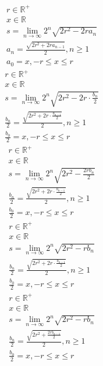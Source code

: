 \documentclass[a4paper,12pt]{report}
\begin{document}
\begin{subequations}
\begin{gather}
r \in \mathbb{R}^+ \\
x \in \mathbb{R} \\
s = \lim \limits_{n \to \infty} 2^n \sqrt{2r^2 - 2ra_n} \\
a_n = \frac{\sqrt{2r^2 + 2ra_{n-1}}}{2}, n \geq 1 \\
a_0 = x, -r \leq x \leq r
\end{gather}
\end{subequations}
\begin{subequations}
\begin{gather}
r \in \mathbb{R}^+ \\
x \in \mathbb{R} \\
s = \lim \limits_{n \to \infty} 2^n \sqrt{2r^2 - 2r \cdot \frac{b_n}{2}} \\
\frac{b_n}{2} = \frac{\sqrt{2r^2 + 2r \cdot \frac{b_{n-1}}{2}}}{2}, n \geq 1 \\
\frac{b_0}{2} = x, -r \leq x \leq r
\end{gather}
\end{subequations}
\begin{subequations}
\begin{gather}
r \in \mathbb{R}^+ \\
x \in \mathbb{R} \\
s = \lim \limits_{n \to \infty} 2^n \sqrt{2r^2 - \frac{2rb_n}{2}} \\
\frac{b_n}{2} = \frac{\sqrt{2r^2 + 2r \cdot \frac{b_{n-1}}{2}}}{2}, n \geq 1 \\
\frac{b_0}{2} = x, -r \leq x \leq r
\end{gather}
\end{subequations}
\begin{subequations}
\begin{gather}
r \in \mathbb{R}^+ \\
x \in \mathbb{R} \\
s = \lim \limits_{n \to \infty} 2^n \sqrt{2r^2 - rb_n} \\
\frac{b_n}{2} = \frac{\sqrt{2r^2 + 2r \cdot \frac{b_{n-1}}{2}}}{2}, n \geq 1 \\
\frac{b_0}{2} = x, -r \leq x \leq r
\end{gather}
\end{subequations}
\begin{subequations}
\begin{gather}
r \in \mathbb{R}^+ \\
x \in \mathbb{R} \\
s = \lim \limits_{n \to \infty} 2^n \sqrt{2r^2 - rb_n} \\
\frac{b_n}{2} = \frac{\sqrt{2r^2 + \frac{2rb_{n-1}}{2}}}{2}, n \geq 1 \\
\frac{b_0}{2} = x, -r \leq x \leq r
\end{gather}
\end{subequations}
\end{document}
